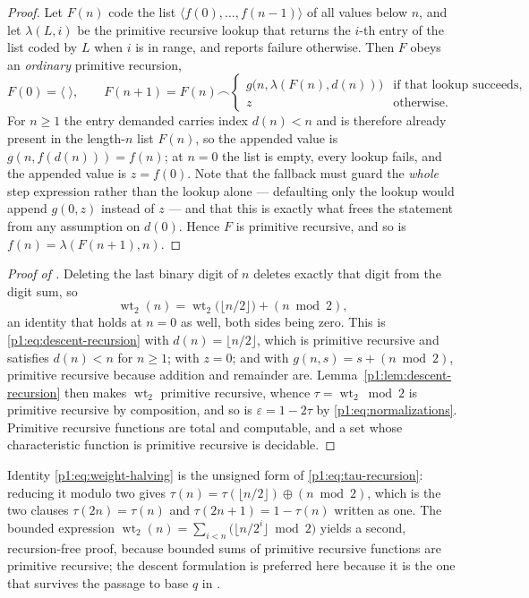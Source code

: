 \documentclass[11pt,oneside]{article}
\numberwithin{equation}{section}
\theoremstyle{definition}
\theoremstyle{remark}
\newcommand{\wt}{\operatorname{wt}_2}
\newcommand{\eps}{\varepsilon}
\newcommand{\xor}{\mathbin{\oplus}}
\begin{document}
\begin{proof}
Let \(F(n)\) code the list \(\langle f(0),\ldots,f(n-1)\rangle\) of
all values below \(n\), and let \(\lambda(L,i)\) be the primitive
recursive lookup that returns the \(i\)-th entry of the list coded by
\(L\) when \(i\) is in range, and reports failure otherwise.  Then
\(F\) obeys an \emph{ordinary} primitive recursion,
\[
  F(0)=\langle\;\rangle,
  \qquad
  F(n+1)=F(n)\frown
  \begin{cases}
    g\bigl(n,\lambda(F(n),d(n))\bigr)
      &\text{if that lookup succeeds},\\
    z&\text{otherwise.}
  \end{cases}
\]
For \(n\ge1\) the entry demanded carries index \(d(n)<n\) and is
therefore already present in the length-\(n\) list \(F(n)\), so the
appended value is \(g(n,f(d(n)))=f(n)\); at \(n=0\) the list is empty,
every lookup fails, and the appended value is \(z=f(0)\).  Note that the
fallback must guard the \emph{whole} step expression rather than the
lookup alone --- defaulting only the lookup would append \(g(0,z)\)
instead of \(z\) --- and that this is exactly what frees the statement
from any assumption on \(d(0)\).  Hence \(F\) is primitive recursive,
and so is \(f(n)=\lambda(F(n+1),n)\).
\end{proof}

\begin{proof}[Proof of ]
Deleting the last binary digit of \(n\) deletes exactly that digit from
the digit sum, so
\begin{equation}
  \wt(n)=\wt\bigl(\lfloor n/2\rfloor\bigr)+(n\bmod2),
  \label{p1:eq:weight-halving}
\end{equation}
an identity that holds at \(n=0\) as well, both sides being zero.  This
is \eqref{p1:eq:descent-recursion} with \(d(n)=\lfloor n/2\rfloor\),
which is primitive recursive and satisfies \(d(n)<n\) for \(n\ge1\);
with \(z=0\); and with \(g(n,s)=s+(n\bmod2)\), primitive recursive
because addition and remainder are.  Lemma~\ref{p1:lem:descent-recursion} then
makes \(\wt\) primitive recursive, whence \(\tau=\wt\bmod2\) is
primitive recursive by composition, and so is \(\eps=1-2\tau\) by
\eqref{p1:eq:normalizations}.  Primitive recursive functions are total and
computable, and a set whose characteristic function is primitive recursive
is decidable.
\end{proof}

\begin{remark}
Identity \eqref{p1:eq:weight-halving} is the unsigned form of
\eqref{p1:eq:tau-recursion}: reducing it modulo two gives
\(\tau(n)=\tau(\lfloor n/2\rfloor)\xor(n\bmod2)\), which is the two
clauses \(\tau(2n)=\tau(n)\) and \(\tau(2n+1)=1-\tau(n)\) written as
one.  The bounded expression
\(\wt(n)=\sum_{i<n}\bigl(\lfloor n/2^i\rfloor\bmod2\bigr)\) yields a
second, recursion-free proof, because bounded sums of primitive recursive
functions are primitive recursive; the descent formulation is preferred
here because it is the one that survives the passage to base \(q\) in
.
\end{remark}
\end{document}
